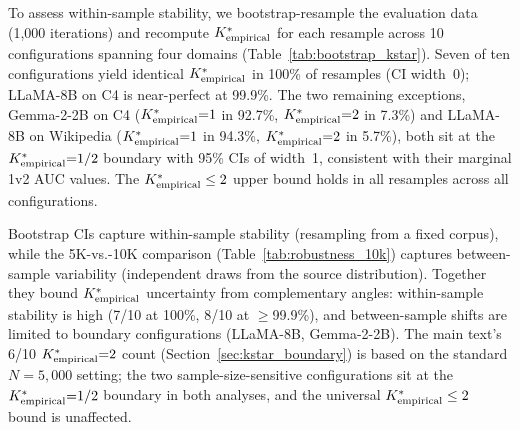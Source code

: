 To assess within-sample stability, we bootstrap-resample the evaluation data (1{,}000 iterations) and recompute ${K^*_{\text{empirical}}}$ for each resample across 10 configurations spanning four domains (Table~\ref{tab:bootstrap_kstar}).
Seven of ten configurations yield identical ${K^*_{\text{empirical}}}$ in 100\% of resamples (CI width~0); LLaMA-8B on C4 is near-perfect at 99.9\%.
The two remaining exceptions, Gemma-2-2B on C4 (${K^*_{\text{empirical}}}{=}1$ in 92.7\%, ${K^*_{\text{empirical}}}{=}2$ in 7.3\%) and LLaMA-8B on Wikipedia (${K^*_{\text{empirical}}}{=}1$ in 94.3\%, ${K^*_{\text{empirical}}}{=}2$ in 5.7\%), both sit at the ${K^*_{\text{empirical}}}{=}1/2$ boundary with 95\% CIs of width~1, consistent with their marginal 1v2 AUC values.
The ${K^*_{\text{empirical}}} \leq 2$ upper bound holds in all resamples across all configurations.

Bootstrap CIs capture within-sample stability (resampling from a fixed corpus), while the 5K-vs.-10K comparison (Table~\ref{tab:robustness_10k}) captures between-sample variability (independent draws from the source distribution).
Together they bound ${K^*_{\text{empirical}}}$ uncertainty from complementary angles: within-sample stability is high (7/10 at 100\%, 8/10 at ${\geq}$99.9\%), and between-sample shifts are limited to boundary configurations (LLaMA-8B, Gemma-2-2B).
The main text's 6/10 ${K^*_{\text{empirical}}}{=}2$ count (Section~\ref{sec:kstar_boundary}) is based on the standard $N{=}5{,}000$ setting; the two sample-size-sensitive configurations sit at the ${K^*_{\text{empirical}}}{=}1/2$ boundary in both analyses, and the universal ${K^*_{\text{empirical}}} \leq 2$ bound is unaffected.

